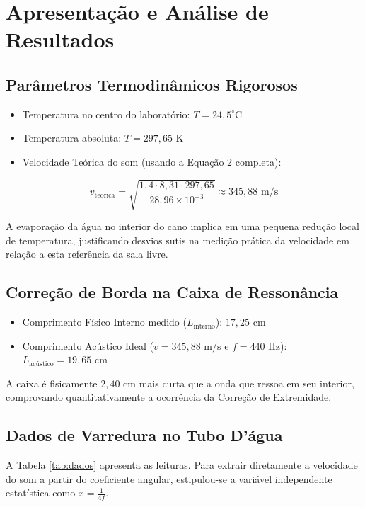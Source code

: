 \documentclass[12pt,a4paper]{article}
\begin{document}
\section{Apresentação e Análise de Resultados}

\subsection{Parâmetros Termodinâmicos Rigorosos}
\begin{itemize}
    \item Temperatura no centro do laboratório: $T = 24,5^\circ\text{C}$
    \item Temperatura absoluta: $T = 297,65\text{ K}$
    \item Velocidade Teórica do som (usando a Equação 2 completa):
\end{itemize}
\begin{equation}
    v_{\text{teorica}} = \sqrt{\frac{1,4 \cdot 8,31 \cdot 297,65}{28,96 \times 10^{-3}}} \approx 345,88\text{ m/s}
\end{equation}

A evaporação da água no interior do cano implica em uma pequena redução local de temperatura, justificando desvios sutis na medição prática da velocidade em relação a esta referência da sala livre.

\subsection{Correção de Borda na Caixa de Ressonância}
\begin{itemize}
    \item Comprimento Físico Interno medido ($L_{\text{interno}}$): $17,25\text{ cm}$
    \item Comprimento Acústico Ideal ($v = 345,88\text{ m/s}$ e $f = 440\text{ Hz}$): $L_{\text{acústico}} = 19,65\text{ cm}$
\end{itemize}

A caixa é fisicamente $2,40\text{ cm}$ mais curta que a onda que ressoa em seu interior, comprovando quantitativamente a ocorrência da Correção de Extremidade.

\subsection{Dados de Varredura no Tubo D'água}
A Tabela \ref{tab:dados} apresenta as leituras. Para extrair diretamente a velocidade do som a partir do coeficiente angular, estipulou-se a variável independente estatística como $x = \frac{1}{4f}$.
\end{document}
